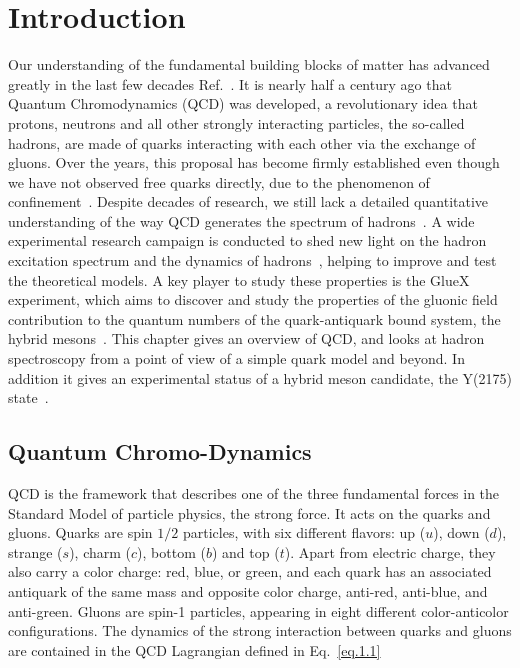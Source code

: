 \chapter{Introduction}
\label{chap.intro}

Our understanding of the fundamental building blocks of matter has advanced greatly in the last few decades Ref.~\cite{Fritzsch94,Gell64,Gell62,Neeman61,Zweig64}. It is nearly half a century ago that Quantum Chromodynamics (QCD) was developed, a revolutionary idea that protons, neutrons and all other strongly interacting particles, the so-called hadrons, are made of quarks interacting with each other via the exchange of gluons. Over the years, this proposal has become firmly established even though we have not observed free quarks directly, due to the phenomenon of confinement~\cite{Gross05}. Despite decades of research, we still lack a detailed quantitative understanding of the way QCD generates the spectrum of hadrons~\cite{Wilczek05}. A wide experimental research campaign is conducted to shed new light on the hadron excitation spectrum and the dynamics of hadrons~\cite{Tanabashi18}, helping to improve and test the theoretical models. A key player to study these properties is the GlueX experiment, which aims to discover and study the properties of the gluonic field contribution to the quantum numbers of the quark-antiquark bound system, the hybrid mesons~\cite{Meyer18}. This chapter gives an overview of QCD, and looks at hadron spectroscopy from a point of view of a simple quark model and beyond. In addition it gives an experimental status of a hybrid meson candidate, the Y(2175) state~\cite{Gui07}.

\section{Quantum Chromo-Dynamics}
\label{p.1.1}

QCD is the framework that describes one of the three fundamental forces in the Standard Model of particle physics, the strong force. It acts on the quarks and gluons. Quarks are spin $1/2$ particles, with six different flavors: up ($u$), down ($d$), strange ($s$), charm ($c$), bottom ($b$) and top ($t$). Apart from electric charge, they also carry a color charge: red, blue, or green, and each quark has an associated antiquark of the same mass and opposite color charge, anti-red, anti-blue, and anti-green. Gluons are spin-1 particles, appearing in eight different color-anticolor configurations. The dynamics of the strong interaction between quarks and gluons are contained in the QCD Lagrangian defined in Eq.~\ref{eq.1.1}

